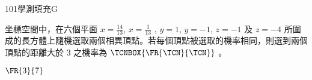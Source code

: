 \begin{QUESTIONS}
\begin{QUESTION}
\begin{QSOLLIST}
        \end{QSOLLIST}
        \begin{QEMPTYSPACE}
        \end{QEMPTYSPACE}
    \end{QUESTION}
    \begin{QUESTION}
        \begin{ExamInfo}{101}{學測}{填充}{G}
        \end{ExamInfo}
        \begin{ExamAnsRateInfo}{23}{54}{13}{2}
        \end{ExamAnsRateInfo}
        \begin{QBODY}
            坐標空間中，在六個平面 $x=\frac{14}{13}$,  $x=\frac{1}{13}$ , $y=1$,  $y=-1$, $z=-1$ 及 $z=-4$ 所圍成的長方體上隨機選取兩個相異頂點。若每個頂點被選取的機率相同，則選到兩個頂點的距離大於 3 之機率為 $\TCNBOX{\FR{\TCN}{\TCN}}$ 。
        \end{QBODY}
        \begin{QFROMS}
        \end{QFROMS}
        \begin{QTAGS}\end{QTAGS}
        \begin{QANS}
            $\FR{3}{7}$
        \end{QANS}
        \begin{QSOLLIST}
        \end{QSOLLIST}
        \begin{QEMPTYSPACE}
        \end{QEMPTYSPACE}
    \end{QUESTION}
\end{QUESTIONS}
